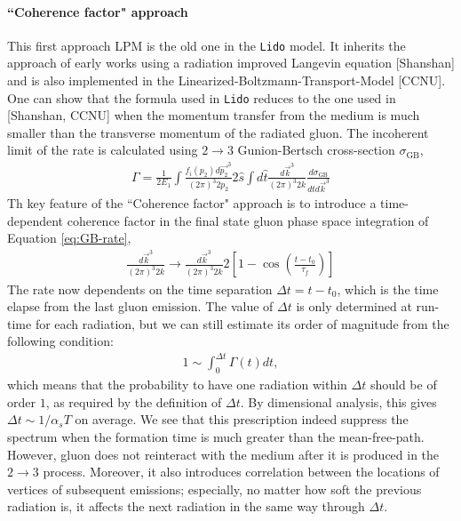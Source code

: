 \documentclass[aps, prc, reprint, amsmath, groupedaddress, nofootinbib]{revtex4-1}
\begin{document}
\paragraph*{``Coherence factor" approach} This first approach LPM is the old one in the {\tt Lido} model. 
It inherits the approach of early works using a radiation improved Langevin equation [Shanshan] and is also implemented in the Linearized-Boltzmann-Transport-Model [CCNU]. 
One can show that the formula used in {\tt Lido} reduces to the one used in [Shanshan, CCNU] when the momentum transfer from the medium is much smaller than the transverse momentum of the radiated gluon.
The incoherent limit of the rate is calculated using $2\rightarrow 3$ Gunion-Bertsch cross-section $\sigma_\textrm{GB}$,
\begin{eqnarray}\label{eq:GB-rate}
\Gamma = \frac{1}{2E_1}\int\frac{f_i(p_2)d\vec{p_2}^3}{(2\pi)^3 2p_2}2\hat{s}\int d\hat{t}\frac{d\vec{k}^3}{(2\pi)^3 2k}\frac{d\sigma_{\textrm{GB}}}{d\hat{t}d\vec{k}^3}
\end{eqnarray}
Th key feature of the ``Coherence factor" approach is to introduce a time-dependent coherence factor in the final state gluon phase space integration of Equation \ref{eq:GB-rate},
\begin{eqnarray}
\frac{d\vec{k}^3}{(2\pi)^3 2k} \rightarrow \frac{d\vec{k}^3}{(2\pi)^3 2k} 2\left[1-\cos\left(\frac{t-t_0}{\tau_f}\right)\right]
\end{eqnarray}
The rate now dependents on the time separation $\Delta t = t-t_0$, which is the time elapse from the last gluon emission.
The value of $\Delta t$ is only determined at run-time for each radiation,
but we can still estimate its order of magnitude from the following condition:
\begin{eqnarray}
1 \sim \int_0^{\Delta t}\Gamma(t) dt,
\end{eqnarray}
which means that the probability to have one radiation within $\Delta t$ should be of order $1$, as required by the definition of $\Delta t$.
By dimensional analysis, this gives $\Delta t \sim 1/\alpha_s T$ on average.
We see that this prescription indeed suppress the spectrum when the formation time is much greater than the mean-free-path.
However, gluon does not reinteract with the medium after it is produced in the $2\rightarrow3$ process.
Moreover, it also introduces correlation between the locations of vertices of subsequent emissions;
especially, no matter how soft the previous radiation is, it affects the next radiation in the same way through $\Delta t$.
\end{document}
